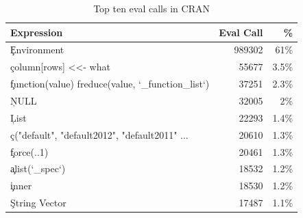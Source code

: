 \documentclass[conference]{IEEEtran}
\begin{document}
\begin{table}[!h]  \centering
\begin{tabular}{@{}l@{~}|@{~}r@{~}r@{}} \hline
Expression & Eval Call &  \% \\\hline
\c{Environment} &                                  989302   & 61\%\\
\c{column[rows] <<- what} &                        55677    & 3.5\%\\
\c{function(value) freduce(value, `_function_list`)} & 37251& 2.3\%\\
\c{NULL} &                         32005    & 2\%\\
\c{List} &                         22293    & 1.4\%\\
\c{c("default", "default2012", "default2011" ...}& 20610    & 1.3\%\\
\c{force(..1)}            &                        20461    & 1.3\%\\
\c{alist(`_spec`)}       &                         18532    & 1.2\%\\
\c{inner}               &                          18530    & 1.2\%\\
\c{String Vector}      &                           17487     & 1.1\%\\
\end{tabular}\caption{Top ten eval calls in CRAN} \label{C}
\end{table}
\end{document}
